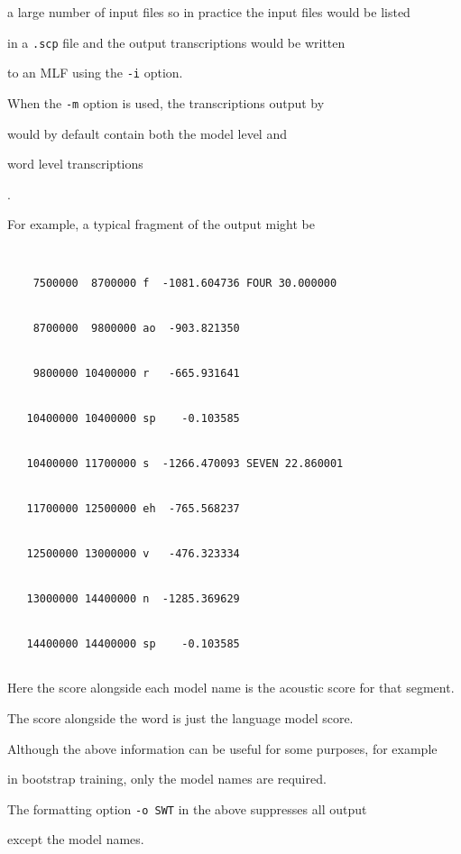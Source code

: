 a large number of input files so in practice the input files would be listed


in a \texttt{.scp} file and the output transcriptions would be written


to an MLF using the \texttt{-i} option.





When the \texttt{-m} option is used, the transcriptions output by  


would by default contain both the model level and 


word level transcriptions


.






For example, a typical fragment of the output might be


\begin{verbatim}


    7500000  8700000 f  -1081.604736 FOUR 30.000000


    8700000  9800000 ao  -903.821350


    9800000 10400000 r   -665.931641


   10400000 10400000 sp    -0.103585


   10400000 11700000 s  -1266.470093 SEVEN 22.860001


   11700000 12500000 eh  -765.568237


   12500000 13000000 v   -476.323334


   13000000 14400000 n  -1285.369629


   14400000 14400000 sp    -0.103585


\end{verbatim}


Here the score alongside each model name is the acoustic score for that segment.


The score alongside the word is just the language model score.





Although the above information can be useful for some purposes, for example


in bootstrap training, only the model names are required.


The formatting option \texttt{-o SWT} in the above suppresses all output


except the model names.





